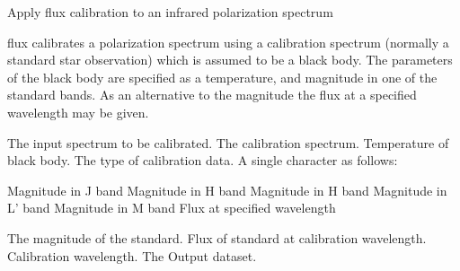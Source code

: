 \begin{manroutinedescription}
        Apply flux calibration to an infrared polarization spectrum

        {} flux calibrates a polarization spectrum using a
        calibration spectrum (normally a standard star observation)
        which is assumed to be a black body.
        The parameters of the black body are specified as a temperature,
        and magnitude in one of the standard bands. As an alternative to
        the magnitude the flux at a specified wavelength may be given.

\begin{manparametertable}
  The input %
spectrum to be calibrated.
  The %
calibration spectrum.
     Temperature of black body.
     The type of calibration %
data. A single
                                character as follows:
\end{manparametertable}
\begin{mantwocolumntable}
Magnitude in J band
Magnitude in H band
Magnitude in H band
Magnitude in L' band
Magnitude in M band
Flux at specified wavelength
\end{mantwocolumntable}
\begin{manparametertable}
     The magnitude of the standard.
     Flux of standard at calibration %
wavelength.
     Calibration wavelength.
  The %
Output dataset.

\end{manparametertable}
\end{manroutinedescription}
